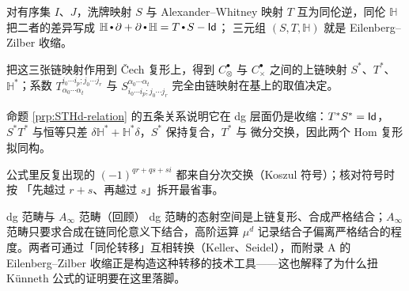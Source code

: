 \begin{keytakeaways}
\item 对有序集 $I$、$J$，洗牌映射 $S$ 与 Alexander--Whitney 映射 $T$ 互为同伦逆，同伦
$\mathbb{H}$ 把二者的差异写成 $\mathbb{H}\comp\partial+\partial\comp\mathbb{H}=T\comp S-\id$；
三元组 $(S,T,\mathbb{H})$ 就是 Eilenberg--Zilber 收缩。
\item 把这三张链映射作用到 \v{C}ech 复形上，得到 $C_{\otimes}^{\bullet}$ 与
$C_{\times}^{\bullet}$ 之间的上链映射 $S^{\ast}$、$T^{\ast}$、$\mathbb{H}^{\ast}$；系数
$T_{\alpha_0\cdots\alpha_t}^{i_0\cdots i_p;j_0\cdots j_r}$ 与
$S_{i_0\cdots i_p;j_0\cdots j_r}^{\alpha_0\cdots\alpha_t}$ 完全由链映射在基上的取值决定。
\item 命题 \ref{prp:STHd-relation} 的五条关系说明它在 dg 层面仍是收缩：$T^{\ast}S^{\ast}=\operatorname{\mathsf{Id}}$，$S^{\ast}T^{\ast}$
与恒等只差 $\delta\mathbb{H}^{\ast}+\mathbb{H}^{\ast}\delta$，$S^{\ast}$ 保持复合，$T^{\ast}$ 与
微分交换，因此两个 Hom 复形拟同构。
\item 公式里反复出现的 $(-1)^{qr+qs+si}$ 都来自分次交换（Koszul 符号）；核对符号时按
「先越过 $r+s$、再越过 $s$」拆开最省事。
\end{keytakeaways}

\begin{conceptbox}{dg 范畴与 $A_\infty$ 范畴（回顾）}
dg 范畴的态射空间是上链复形、合成严格结合；$A_\infty$ 范畴只要求合成在链同伦意义下结合，高阶运算 $\mu^d$ 记录结合子偏离严格结合的程度。两者可通过「同伦转移」互相转换（Keller、Seidel），而附录 A 的 Eilenberg--Zilber 收缩正是构造这种转移的技术工具——这也解释了为什么扭 Künneth 公式的证明要在这里落脚。
\par\smallskip{}
\end{conceptbox}
